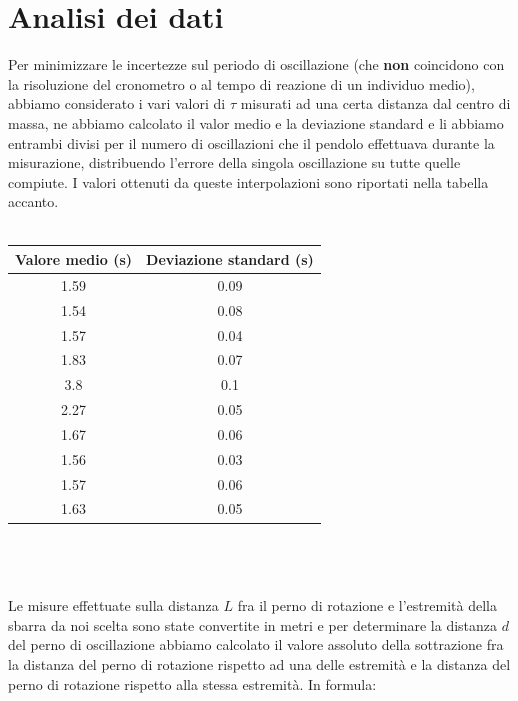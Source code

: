 \documentclass{article}
\begin{document}
\section{Analisi dei dati}

\begin{minipage}{0.45\textwidth} \vspace{1cm}
Per minimizzare le incertezze sul periodo di oscillazione (che \textbf{non} coincidono con la risoluzione del cronometro o al tempo di reazione di un individuo medio), abbiamo considerato i vari valori di $\tau$ misurati ad una certa distanza dal centro di massa, ne abbiamo calcolato il valor medio e la deviazione standard e li abbiamo entrambi divisi per il numero di oscillazioni che il pendolo effettuava durante la misurazione, distribuendo l'errore della singola oscillazione su tutte quelle compiute. I valori ottenuti da queste interpolazioni sono riportati nella tabella accanto. \\ \\
\end{minipage}
\hspace{0.05\textwidth}
\begin{minipage}{0.45\textwidth}		
		\begin{tabular}{| c | c |} \hline
			 \textbf{Valore medio (s)} & \textbf{Deviazione standard (s)} \\
			 \hline
			 1.59 & 0.09 \\ \hline
			 1.54 & 0.08 \\ \hline
			 1.57 & 0.04 \\ \hline
			 1.83 & 0.07 \\ \hline
			 3.8 & 0.1 \\ \hline
			 2.27 & 0.05 \\ \hline
			 1.67 & 0.06 \\ \hline
			 1.56 & 0.03 \\ \hline
			 1.57 & 0.06 \\ \hline
			 1.63 & 0.05 \\ \hline
		\end{tabular}
		\label{table:tab_average_standard_deviation}
\end{minipage} \\ \\ \\
Le misure effettuate sulla distanza $L$ fra il perno di rotazione e l'estremità della sbarra da noi scelta sono state convertite in metri e per determinare la distanza $d$ del perno di oscillazione abbiamo calcolato il valore assoluto della sottrazione fra la distanza del perno di rotazione rispetto ad una delle estremità  e la distanza del perno di rotazione rispetto alla stessa estremità. In formula:
\end{document}
